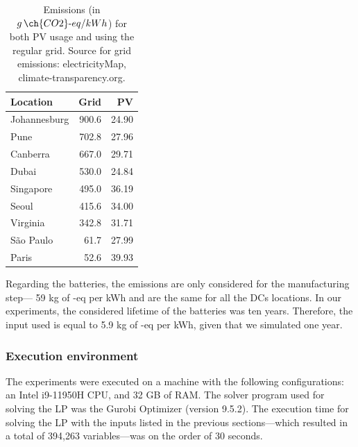 \begin{table}[h]

  \caption{Emissions (in $g\,\ch{CO2}\text{-}eq/kWh$) for both PV usage and using the regular grid. Source for grid emissions: electricityMap, climate-transparency.org.}\label{tab:carbonfootprint} \centering
  \begin{tabular}{|l|r|r|}
    
  \hline
    
  \textbf{Location} &  \textbf{Grid} & \textbf{PV} \\
  \hline
  Johannesburg & 900.6 & 24.90 \\
  \hline
  Pune & 702.8 & 27.96 \\
  \hline
  Canberra & 667.0 & 29.71 \\
  \hline
  Dubai & 530.0  & 24.84 \\
  \hline
  Singapore & 495.0 & 36.19 \\
  \hline     
  Seoul & 415.6 & 34.00 \\
  \hline
  Virginia  & 342.8 & 31.71 \\
  \hline
  São Paulo &  61.7 & 27.99\\
  \hline 
  Paris &  52.6  & 39.93 \\
  \hline  

\end{tabular}  
\end{table}

Regarding the batteries, the emissions are only considered for the manufacturing step--- 59 kg of -eq per kWh and are the same for all the DCs locations. In our experiments, the considered lifetime of the batteries was ten years. Therefore, the input used is equal to 5.9 kg of -eq per kWh, given that we simulated one year.

\subsubsection{Execution environment}
 
The experiments were executed on a machine with the following configurations: an Intel i9-11950H CPU, and 32 GB of RAM. The solver program used for solving the LP was the Gurobi Optimizer (version 9.5.2). The execution time for solving the LP with the inputs listed in the previous sections---which resulted in a total of 394,263 variables---was on the order of 30 seconds.


